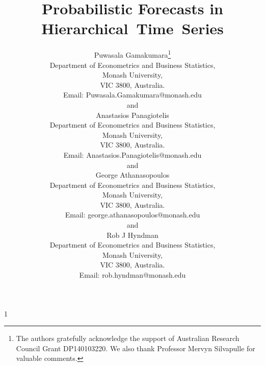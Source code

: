 \documentclass[12pt]{article}
\newcommand{\blind}{1}
\theoremstyle{definition}
\begin{document}
	
	\def\spacingset#1{\renewcommand{\baselinestretch}%
		{#1}\small\normalsize} \spacingset{1}
	
	
	
	\blind
	{
		\title{\bf Probabilistic Forecasts in Hierarchical~Time~Series}
		        \author{Puwasala Gamakumara\thanks{
		        The authors gratefully acknowledge the support of Australian Research Council Grant DP140103220.  We also thank Professor Mervyn Silvapulle for valuable comments.}\hspace{.2cm}\\
			    Department of Econometrics and Business Statistics,\\
			    Monash University,\\ VIC 3800, Australia.\\
			    Email: Puwasala.Gamakumara@monash.edu \\
			    and \\
			    Anastasios Panagiotelis\\
			    Department of Econometrics and Business Statistics,\\
		    	Monash University,\\ VIC 3800, Australia.\\
			    Email: Anastasios.Panagiotelis@monash.edu \\
			    and \\
		        George Athanasopoulos\\
		        Department of Econometrics and Business Statistics,\\
		        Monash University,\\ VIC 3800, Australia.\\
		        Email: george.athanasopoulos@monash.edu \\
		        and \\
	            Rob J Hyndman\\
	            Department of Econometrics and Business Statistics,\\
	            Monash University,\\ VIC 3800, Australia.\\
	            Email: rob.hyndman@monash.edu \\}
		\maketitle
	} \fi
	
\end{document}

